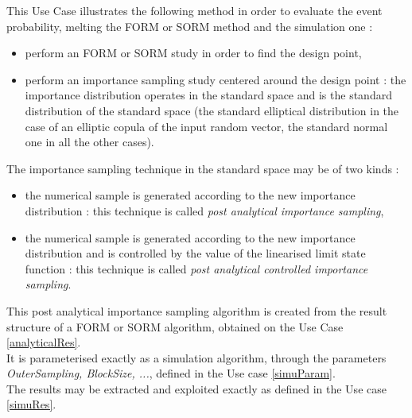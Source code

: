 \renewcommand{\filename}{docUC_ThresholdExceedance_FORMandImportanceSampling.tex}
\renewcommand{\filetitle}{UC : Probability evaluation from an analytical method (FORM/SORM) followed by a simulation method centered on the design point}

\HeaderIIILevel





This Use Case illustrates the following method in order to evaluate the event probability, melting the FORM or SORM method and the simulation one :
\begin{itemize}
\item  perform an FORM or SORM study in order to find the design point,
\item  perform an importance sampling study centered around the design point : the importance distribution operates in the standard space and is the standard distribution of the standard space (the standard elliptical distribution in the case of an elliptic copula of the input random vector, the standard normal one in all the other cases).
\end{itemize}

The importance sampling technique in the standard space may be of two kinds :
\begin{itemize}
\item the numerical sample is generated according to the new importance distribution : this technique is called {\itshape post analytical  importance sampling},
\item the numerical sample is generated according to the new importance distribution and is controlled by the value of the linearised limit state function : this technique is called {\itshape post analytical  controlled importance sampling}.
\end{itemize}

This post analytical importance sampling algorithm is created from the result structure of a FORM or SORM algorithm, obtained on the Use Case \ref{analyticalRes}.\\
It is parameterised exactly as a simulation algorithm, through the parameters {\itshape OuterSampling, BlockSize, ...}, defined in the Use case \ref{simuParam}. \\
The results may be extracted and exploited exactly as defined in the Use case \ref{simuRes}.\\

